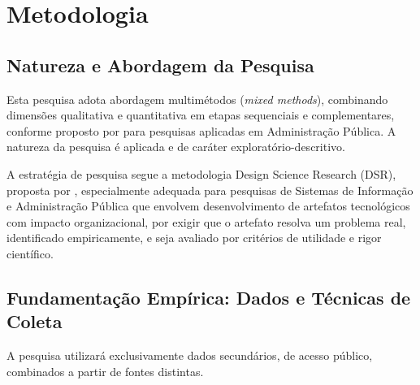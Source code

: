 \chapter{Metodologia}
\label{cap:metodologia}

\section{Natureza e Abordagem da Pesquisa}
\label{sec:natureza-abordagem}

Esta pesquisa adota abordagem multim\'etodos (\textit{mixed methods}),
combinando dimens\~oes qualitativa e quantitativa em etapas sequenciais e
complementares, conforme proposto por \textcite{creswell2018} para
pesquisas aplicadas em Administra\c{c}\~ao P\'ublica. A natureza da
pesquisa \'e aplicada e de car\'ater explorat\'orio-descritivo.

A estrat\'egia de pesquisa segue a metodologia Design Science Research
(DSR), proposta por \textcite{hevner2004}, especialmente adequada para
pesquisas de Sistemas de Informa\c{c}\~ao e Administra\c{c}\~ao P\'ublica
que envolvem desenvolvimento de artefatos tecnol\'ogicos com impacto
organizacional, por exigir que o artefato resolva um problema real,
identificado empiricamente, e seja avaliado por crit\'erios de utilidade
e rigor cient\'ifico.

\section{Fundamenta\c{c}\~ao Emp\'irica: Dados e T\'ecnicas de Coleta}
\label{sec:dados-coleta}

A pesquisa utilizar\'a exclusivamente dados secund\'arios, de acesso p\'ublico, combinados a partir de fontes distintas.

